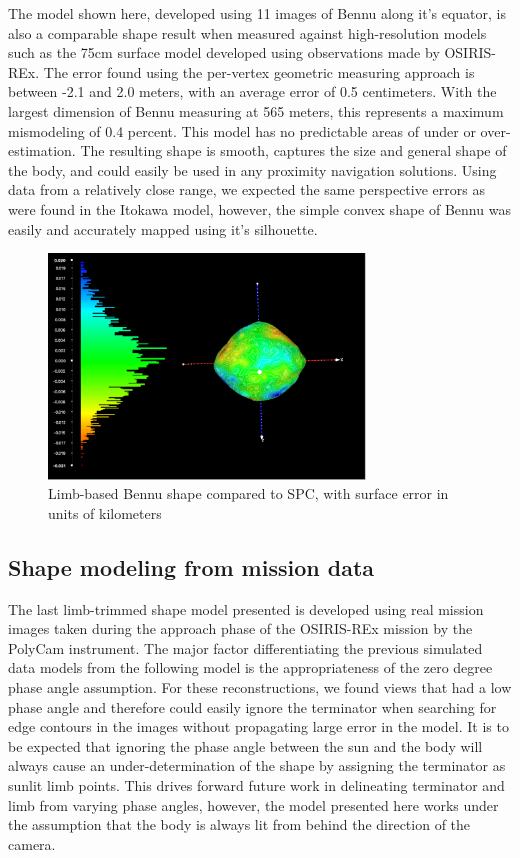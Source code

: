 The model shown here, developed using 11 images of Bennu along it's equator, is also a comparable shape result when measured against high-resolution models such as the 75cm surface model developed using observations made by OSIRIS-REx. The error found using the per-vertex geometric measuring approach is between -2.1 and 2.0 meters, with an average error of 0.5 centimeters. With the largest dimension of Bennu measuring at 565 meters, this represents a maximum mismodeling of 0.4 percent. This model has no predictable areas of under or over-estimation. The resulting shape is smooth, captures the size and general shape of the body, and could easily be used in any proximity navigation solutions. Using data from a relatively close range, we expected the same perspective errors as were found in the Itokawa model, however, the simple convex shape of Bennu was easily and accurately mapped using it's silhouette.  


\begin{figure}[h!]
    \centering
    \includegraphics[width=0.75\textwidth]{fig/bennu_sim.png}
    \caption{Limb-based Bennu shape compared to SPC, with surface error in units of kilometers}
    \label{fig:bennu_error}
\end{figure}


\subsection{Shape modeling from mission data}
The last limb-trimmed shape model presented is developed using real mission images taken during the approach phase of the OSIRIS-REx mission by the PolyCam instrument. The major factor differentiating the previous simulated data models from the following model is the appropriateness of the zero degree phase angle assumption. For these reconstructions, we found views that had a low phase angle and therefore could easily ignore the terminator when searching for edge contours in the images without propagating large error in the model. It is to be expected that ignoring the phase angle between the sun and the body will always cause an under-determination of the shape by assigning the terminator as sunlit limb points. This drives forward future work in delineating terminator and limb from varying phase angles, however, the model presented here works under the assumption that the body is always lit from behind the direction of the camera. 

